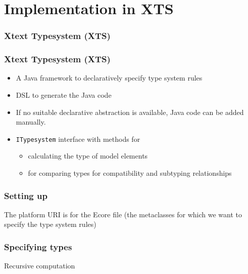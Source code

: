 \section[XTS]{Implementation in XTS}

\begin{frame}
  \frametitle{Xtext Typesystem (XTS)}
  \tableofcontents[currentsection]
\end{frame}

\begin{frame}
  \frametitle{Xtext Typesystem (XTS)}
  \begin{itemize}
  \item A Java framework to declaratively specify type system rules 
  \item DSL to generate the Java code
   \item If no suitable declarative abstraction is available, 
   Java code can be added manually.
   \item \texttt{ITypesystem} interface with methods for
   \begin{itemize}
	\item calculating the type of model elements
	\item for comparing types for
	compatibility and subtyping relationships
   \end{itemize}
\end{itemize}
\end{frame}

\begin{frame}[fragile]
  \frametitle{Setting up}


  \begin{footnotesize}
    
  \end{footnotesize}


The platform URI is for the Ecore file (the metaclasses for
which we want to specify the type system rules)

\end{frame}

\begin{frame}[fragile]
  \frametitle{Specifying types}

  \begin{footnotesize}
    
  \end{footnotesize}


  \begin{footnotesize}
    
  \end{footnotesize}


\medskip

	Recursive computation

  \begin{footnotesize}
    
  \end{footnotesize}


\end{frame}

